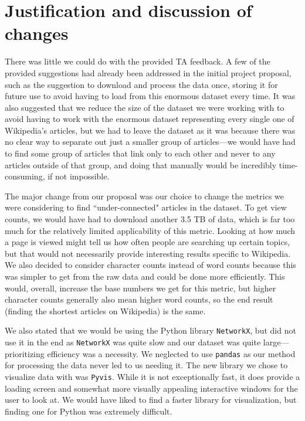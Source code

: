\documentclass[fontsize=12pt]{article}
\begin{document}
\begin{multicols}{2}
\begin{enumerate}
\end{enumerate}

    \section{Justification and discussion of changes}
    There was little we could do with the provided TA feedback. A few of the provided suggestions had already been addressed in the initial project proposal, such as the suggestion to download and process the data once, storing it for future use to avoid having to load from this enormous dataset every time. It was also suggested that we reduce the size of the dataset we were working with to avoid having to work with the enormous dataset representing every single one of Wikipedia's articles, but we had to leave the dataset as it was because there was no clear way to separate out just a smaller group of articles---we would have had to find some group of articles that link only to each other and never to any articles outside of that group, and doing that manually would be incredibly time-consuming, if not impossible.
    
    The major change from our proposal was our choice to change the metrics we were considering to find ``under-connected" articles in the dataset. To get view counts, we would have had to download another 3.5 TB of data, which is far too much for the relatively limited applicability of this metric. Looking at how much a page is viewed might tell us how often people are searching up certain topics, but that would not necessarily provide interesting results specific to Wikipedia. We also decided to consider character counts instead of word counts because this was simpler to get from the raw data and could be done more efficiently. This would, overall, increase the base numbers we get for this metric, but higher character counts generally also mean higher word counts, so the end result (finding the shortest articles on Wikipedia) is the same.
    
    We also stated that we would be using the Python library \texttt{NetworkX}, but did not use it in the end as \texttt{NetworkX} was quite slow and our dataset was quite large---prioritizing efficiency was a necessity. We neglected to use \texttt{pandas} as our method for processing the data never led to us needing it. The new library we chose to visualize data with was \texttt{Pyvis}. While it is not exceptionally fast, it does provide a loading screen and somewhat more visually appealing interactive windows for the user to look at. We would have liked to find a faster library for visualization, but finding one for Python was extremely difficult.
    

\end{multicols}
\end{document}
